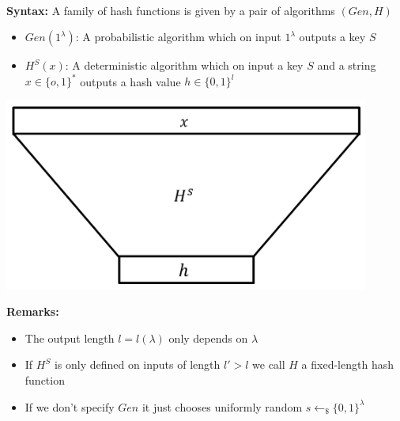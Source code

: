 \begin{definition}\ \\
    \textbf{Syntax:}
    A family of hash functions is given by a pair of algorithms $(Gen,H)$
    \begin{itemize}
        \item $Gen(1^{\lambda})$: A probabilistic algorithm which on input $1^{\lambda}$ outputs a key $S$
        \item $H^S(x)$: A deterministic algorithm which on input a key $S$ and a string $x \in \{o,1\}^*$ outputs a hash value $h \in \{0,1\}^l$
    \end{itemize}
   	\begin{center}
		\includegraphics[width=120mm]{Graphics/Hash Functions/hf1.png}
	\end{center}
    \textbf{Remarks:}
    \begin{itemize}
        \item The output length $l=l(\lambda)$ only depends on $\lambda$
        \item If $H^S$ is only defined on inputs of length $l' > l$ we call $H$ a fixed-length hash function
        \item If we don't specify $Gen$ it just chooses uniformly random $s \leftarrow_{\$} \{0,1\}^{\lambda}$
    \end{itemize}
\end{definition}


